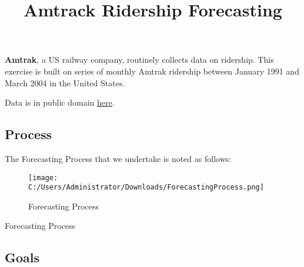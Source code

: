 \documentclass[]{article}
\title{Amtrack Ridership Forecasting}
\author{}
\date{}
\begin{document}
\maketitle

\textbf{Amtrak}, a US railway company, routinely collects data on
ridership. This exercise is built on series of monthly Amtrak ridership
between January 1991 and March 2004 in the United States.

Data is in public domain
\href{https://docs.google.com/open?id=0B76mgCvz1US5Z1lGRkZQZ1pRLTQ}{here}.

\subsection{Process}\label{process}

The Forecasting Process that we undertake is noted as follows:

\begin{figure}
\centering
\texttt{[image: C:/Users/Administrator/Downloads/ForecastingProcess.png]}
\caption{Forecasting Process}
\end{figure}

Forecasting Process

\subsection{Goals}\label{goals}
\end{document}
